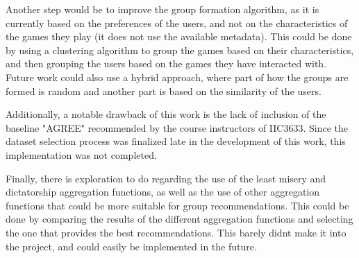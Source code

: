 \documentclass{article}
\begin{document}
Another step would be to improve the group formation algorithm, as it is currently based on the preferences of the users, and not on the characteristics of the games they play (it does not use the available metadata). This could be done by using a clustering algorithm to group the games based on their characteristics, and then grouping the users based on the games they have interacted with. Future work could also use a hybrid approach, where part of how the groups are formed is random and another part is based on the similarity of the users.

Additionally, a notable drawback of this work is the lack of inclusion of the baseline "AGREE" recommended by the course instructors of IIC3633. Since the dataset selection process was finalized late in the development of this work, this implementation was not completed.

Finally, there is exploration to do regarding the use of the least misery and dictatorship aggregation functions, as well as the use of other aggregation functions that could be more suitable for group recommendations. This could be done by comparing the results of the different aggregation functions and selecting the one that provides the best recommendations. This barely didnt make it into the project, and could easily be implemented in the future.



\end{document}
